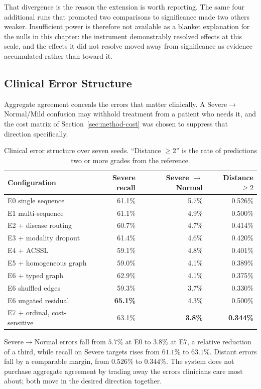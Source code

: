 \documentclass[12pt,a4paper]{report}
\begin{document}
That divergence is the reason the extension is worth reporting. The same four
additional runs that promoted two comparisons to significance made two others
weaker. Insufficient power is therefore not available as a blanket explanation
for the nulls in this chapter: the instrument demonstrably resolved effects at
this scale, and the effects it did not resolve moved away from significance as
evidence accumulated rather than toward it.

\subsection{Clinical Error Structure}
\label{sec:results-errors}

Aggregate agreement conceals the errors that matter clinically. A
Severe$\rightarrow$Normal/Mild confusion may withhold treatment from a patient
who needs it, and the cost matrix of Section~\ref{sec:method-cost} was chosen to
suppress that direction specifically.

\begin{table}[htbp]
\centering
\caption{Clinical error structure over seven seeds. \enquote{Distance $\geq 2$}
is the rate of predictions two or more grades from the reference.}
\label{tab:errors}
\begin{tabular}{lrrr}
\toprule
Configuration & Severe recall & Severe $\rightarrow$ Normal & Distance $\geq 2$ \\
\midrule
E0 single sequence & 61.1\% & 5.7\% & 0.526\% \\
E1 multi-sequence & 61.1\% & 4.9\% & 0.500\% \\
E2 + disease routing & 60.7\% & 4.7\% & 0.414\% \\
E3 + modality dropout & 61.4\% & 4.6\% & 0.420\% \\
E4 + ACSSL & 59.1\% & 4.8\% & 0.401\% \\
E5 + homogeneous graph & 59.0\% & 4.1\% & 0.389\% \\
E6 + typed graph & 62.9\% & 4.1\% & 0.375\% \\
\quad E6 shuffled edges & 59.3\% & 3.7\% & 0.330\% \\
\quad E6 ungated residual & \textbf{65.1\%} & 4.3\% & 0.500\% \\
E7 + ordinal, cost-sensitive & 63.1\% & \textbf{3.8\%} & \textbf{0.344\%} \\
\bottomrule
\end{tabular}
\end{table}

Severe$\rightarrow$Normal errors fall from $5.7\%$ at E0 to $3.8\%$ at E7, a
relative reduction of a third, while recall on Severe targets rises from
$61.1\%$ to $63.1\%$. Distant errors fall by a comparable margin, from $0.526\%$
to $0.344\%$. The system does not purchase aggregate agreement by trading away
the errors clinicians care most about; both move in the desired direction
together.
\end{document}
